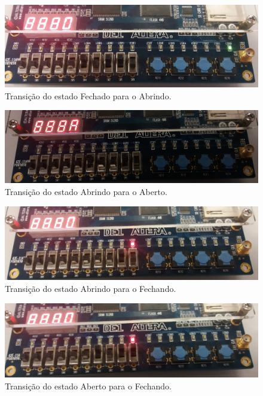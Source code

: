 		\begin{figure}[H]
			\includegraphics[width=1\textwidth]{img/maquina/placa/Fechado-Abrindo}
			\caption{Transição do estado Fechado para o Abrindo.\label{figura:deployMaquina2}}
		\end{figure}

		\begin{figure}[H]
			\includegraphics[width=1\textwidth]{img/maquina/placa/Abrindo-Aberto}
			\caption{Transição do estado Abrindo para o Aberto.\label{figura:deployMaquina3}}
		\end{figure}

		\begin{figure}[H]
			\includegraphics[width=1\textwidth]{img/maquina/placa/Abrindo-Fechando}
			\caption{Transição do estado Abrindo para o Fechando.\label{figura:deployMaquina4}}
		\end{figure}

		\begin{figure}[H]
			\includegraphics[width=1\textwidth]{img/maquina/placa/Aberto-Fechando}
			\caption{Transição do estado Aberto para o Fechando.\label{figura:deployMaquina5}}
		\end{figure}

